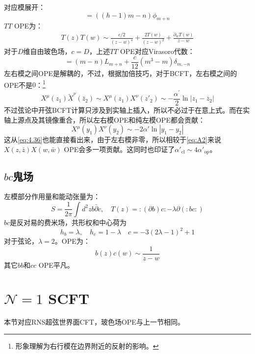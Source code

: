 对应模展开：
\begin{equation}
[L_m,\phi_n]=((h-1)m-n)\phi_{m+n}
\end{equation}
$TT$ OPE为：
\begin{equation}
	\label{eq:A8}
	\begin{aligned}
		T(z)T(w)\sim\frac{c/2}{(z-w)^4}+\frac{2T(w)}{(z-w)^2}+\frac{\partial_wT(w)}{z-w}
	\end{aligned}
\end{equation}
对于$D$维自由玻色场，$c= D$，上述$TT$ OPE对应Virasoro代数：
\begin{equation}
	[L_m,L_n] = (m-n)L_{m+n}+\frac{c}{12}\left(m^{3}-m\right)\delta_{m,-n}
\end{equation}
左右模之间OPE是解耦的，不过，根据加倍技巧，对于BCFT，左右模之间的OPE不是$0$：\footnote{形象理解为右行模在边界附近的反射的影响。}
\begin{equation}
	X^\mu(z_1)\tilde X^\nu(\bar z_2)\sim X^\mu(z_1)X^\nu(z'_2)\sim -\frac{\alpha^{\prime}}{2}\ln|z_1-\overline{z}_2|
\end{equation}
不过弦论中开弦BCFT计算只涉及到实轴上插入，所以不必过于在意上式。而在实轴上源点及其镜像重合，所以左右模OPE和纯左模OPE都会贡献：
\begin{equation}
	 X^\mu (y_1) X^\nu(y_2) \sim -2\alpha'\ln |y_1-y_2|
\end{equation}
这从\ref{eq:4.36}也能直接看出来，由于左右模非零，所以相较于\ref{eq:A2}来说$X(z,\bar z)X(w,\bar w)$ OPE会多一项贡献。这同时也印证了$\alpha'_{\text{cl}}\sim4\alpha'_{\text{op}}$。
\subsection{$bc$鬼场}
左模部分作用量和能动张量为：
\begin{equation}
	\label{eq:A12}
	S=\frac{1}{2\pi}\int d^2zb\bar{\partial}c,\quad T(z)=:(\partial b)c:-\lambda\partial(:bc:)
\end{equation}
$bc$是反对易的费米场，共形权和中心荷为
\begin{equation}
	h_b=\lambda,\quad h_c=1-\lambda\quad c=-3(2\lambda-1)^2+1
\end{equation}
对于弦论，$\lambda = 2$。OPE为：
\begin{equation}
	b(z)c(w)\sim\frac{1}{z-w}
\end{equation}
其它$bb$和$cc$ OPE平凡。
\section{$\mathcal{N}=1$ SCFT}
本节对应RNS超弦世界面CFT，玻色场OPE与上一节相同。
